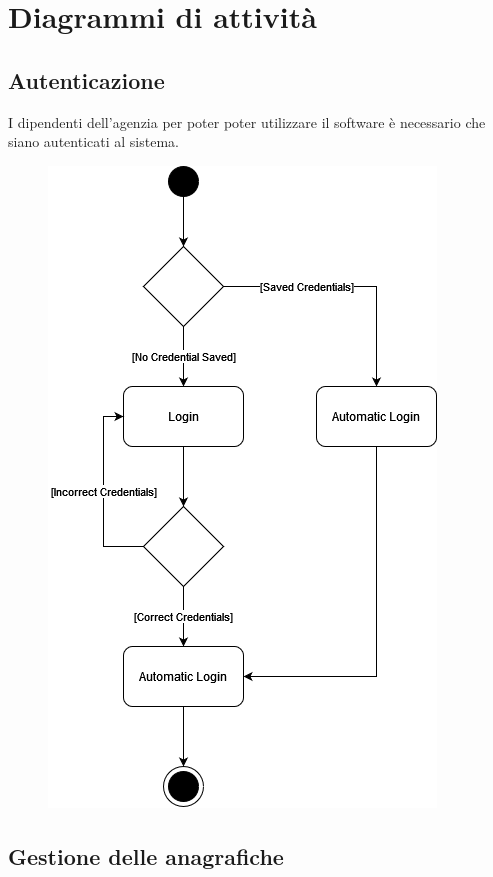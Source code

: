 \documentclass[a4paper, oneside, 12pt]{article}
\begin{document}
\newpage
\section{Diagrammi di attività}
\subsection{Autenticazione}
I dipendenti dell'agenzia per poter poter utilizzare il software è necessario che siano autenticati al sistema.

\begin{figure}[H]
	\centering
	\includegraphics[width = 10 cm]{images/logincredenziali.png}
	\label{fig:login credenziali}
\end{figure}

\newpage
\subsection{Gestione delle anagrafiche}
\end{document}
